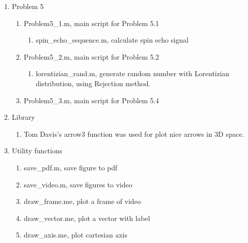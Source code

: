 \documentclass[a4paper,11pt]{article}
\begin{document}
\begin{enumerate}
\begin{enumerate}
    \end{enumerate}
    \item Problem 5
    \begin{enumerate}
        \item Problem5_1.m, main script for Problem 5.1
        \begin{enumerate}
            \item spin_echo_sequence.m, calculate spin echo signal
        \end{enumerate}
        \item Problem5_2.m, main script for Problem 5.2
        \begin{enumerate}
            \item lorentizian_rand.m, generate random number with Lorentizian distribution, using Rejection method.
        \end{enumerate}
        \item Problem5_3.m, main script for Problem 5.4
    \end{enumerate}
    \item Library
    \begin{enumerate}
        \item Tom Davis's arrow3 function was used for plot nice arrows in 3D space.
    \end{enumerate}
    \item Utility functions
    \begin{enumerate}
        \item save_pdf.m, save figure to pdf
        \item save_video.m, save figures to video
        \item draw_frame.me, plot a frame of video
        \item draw_vector.me, plot a vector with label
        \item draw_axis.me, plot cartesian axis 
    \end{enumerate}
  \end{enumerate}
\end{document}
